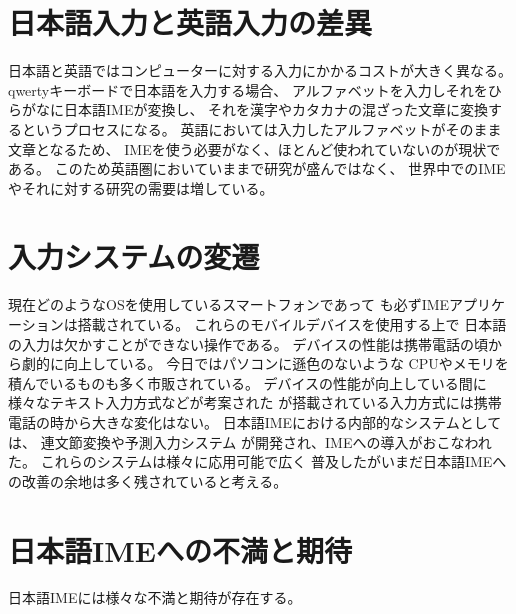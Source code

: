 \section{日本語入力と英語入力の差異}
日本語と英語ではコンピューターに対する入力にかかるコストが大きく異なる。
qwertyキーボードで日本語を入力する場合、
アルファベットを入力しそれをひらがなに日本語IMEが変換し、
それを漢字やカタカナの混ざった文章に変換するというプロセスになる。
英語においては入力したアルファベットがそのまま文章となるため、
IMEを使う必要がなく、ほとんど使われていないのが現状である。
このため英語圏においていままで研究が盛んではなく、
世界中でのIMEやそれに対する研究の需要は増している。

\section{入力システムの変遷}
現在どのようなOSを使用しているスマートフォンであって
も必ずIMEアプリケーションは搭載されている。
これらのモバイルデバイスを使用する上で
日本語の入力は欠かすことができない操作である。
デバイスの性能は携帯電話の頃から劇的に向上している。
今日ではパソコンに遜色のないような
CPUやメモリを積んでいるものも多く市販されている。
デバイスの性能が向上している間に
様々なテキスト入力方式などが考案された\cite{増井俊之:2002-08-01}
が搭載されている入力方式には携帯電話の時から大きな変化はない。
日本語IMEにおける内部的なシステムとしては、
連文節変換や予測入力システム\cite{pobox}
が開発され、IMEへの導入がおこなわれた。
これらのシステムは様々に応用可能で広く
普及したがいまだ日本語IMEへの改善の余地は多く残されていると考える。

\section{日本語IMEへの不満と期待}
日本語IMEには様々な不満と期待が存在する。

